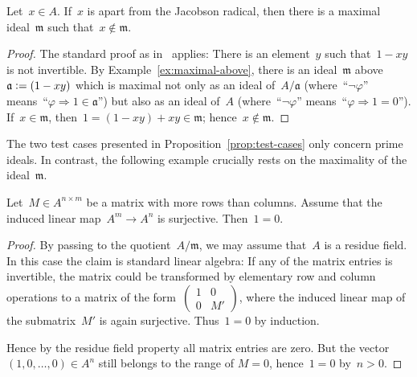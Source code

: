 \documentclass[envcountsect,envcountsame,runningheads]{llncs}
\newcommand{\aaa}{\mathfrak{a}}
\newcommand{\mmm}{\mathfrak{m}}
\newcommand{\defeq}{\vcentcolon=}
\renewcommand{\_}{\mathpunct{.}\,}
\begin{document}
\begin{proposition}Let~$x \in A$. If~$x$ is apart from the Jacobson radical, then
there is a maximal ideal~$\mmm$ such that~$x \not\in \mmm$.
\end{proposition}

\begin{proof}The standard proof as
in~\cite[Lemma~IX.1.1]{lombardi-quitte:constructive-algebra} applies: There is
an element~$y$ such that~$1-xy$
is not invertible. By Example~\ref{ex:maximal-above}, there is an ideal~$\mmm$
above~$\aaa \defeq (1-xy)$ which is maximal not only as an ideal of~$A/\aaa$
(where~``$\neg\varphi$'' means~``$\varphi \Rightarrow 1 \in \aaa$'') but also as an
ideal of~$A$ (where~``$\neg\varphi$'' means~``$\varphi \Rightarrow 1 = 0$''). If~$x
\in \mmm$, then~$1 = (1-xy) + xy \in \mmm$; hence~$x \not\in \mmm$.
\end{proof}

The two test cases presented in Proposition~\ref{prop:test-cases} only concern
prime ideals. In contrast, the following example crucially rests on the
maximality of the ideal~$\mmm$.

\begin{proposition}Let~$M \in A^{n \times m}$ be a matrix with more rows than
columns. Assume that the induced linear map~$A^m \to A^n$ is surjective.
Then~$1 = 0$.
\end{proposition}

\begin{proof}By passing to the quotient~$A/\mmm$, we may assume that~$A$ is a
residue field. In this case the claim is standard linear algebra:
%
If any of the matrix entries
is invertible, the matrix could be transformed by elementary row and
column operations to a matrix of the form~$\left(\begin{smallmatrix}1 & 0 \\ 0 &
M'\end{smallmatrix}\right)$, where the induced linear map of the submatrix~$M'$ is again
surjective. Thus~$1 = 0$ by induction.

Hence by the residue field property all matrix entries are zero.
But the vector $(1,0,\ldots,0)\in A^n$ still
belongs to the range of $M=0$, hence~$1=0$ by~$n > 0$.
\end{proof}
\end{document}
